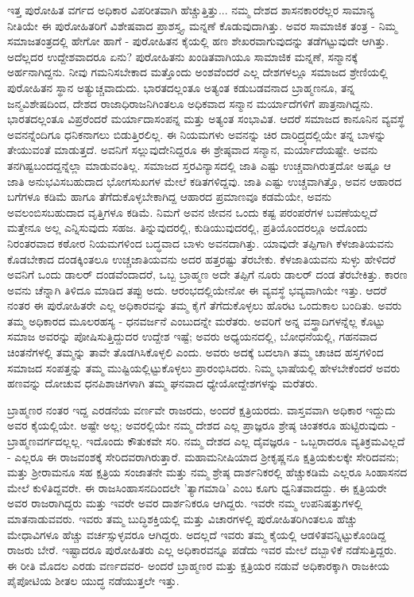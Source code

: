 ಇತ್ತ ಪುರೋಹಿತ ವರ್ಗದ ಅಧಿಕಾರ ವಿಪರೀತವಾಗಿ ಹೆಚ್ಚುತ್ತಿತ್ತು... ನಮ್ಮ ದೇಶದ ಶಾಸನಕಾರರೆಲ್ಲರ ಸಾಮಾನ್ಯ ನೀತಿಯೇ ಈ ಪುರೋಹಿತರಿಗೆ ವಿಶೇಷವಾದ ಪ್ರಾಶಸ್ತ್ಯ, ಮನ್ನಣೆ ಕೊಡುವುದಾಗಿತ್ತು. ಅವರ ಸಾಮಾಜಿಕ ತಂತ್ರ - ನಿಮ್ಮ ಸಮಾಜತಂತ್ರದಲ್ಲಿ ಹೇಗೋ ಹಾಗೆ - ಪುರೋಹಿತನ ಕೈಯಲ್ಲಿ ಹಣ ಶೇಖರವಾಗುವುದನ್ನು ತಡೆಗಟ್ಟುವುದೇ ಆಗಿತ್ತು. ಅದೆಲ್ಲದರ ಉದ್ದೇಶವಾದರೂ ಏನು? ಪುರೋಹಿತನು ಖಂಡಿತವಾಗಿಯೂ ಸಾಮಾಜಿಕ ಮನ್ನಣೆ, ಸನ್ಮಾನಕ್ಕೆ ಅರ್ಹನಾಗಿದ್ದನು. ನೀವು ಗಮನಿಸಬೇಕಾದ ಮತ್ತೊಂದು ಅಂಶವೆಂದರೆ ಎಲ್ಲ ದೇಶಗಳಲ್ಲೂ ಸಮಾಜದ ಶ್ರೇಣಿಯಲ್ಲಿ ಪುರೋಹಿತನ ಸ್ಥಾನ ಅತ್ಯುಚ್ಚವಾದುದು. ಭಾರತದಲ್ಲಂತೂ ಅತ್ಯಂತ ಕಡುಬಡವನಾದ ಬ್ರಾಹ್ಮಣನೂ, ತನ್ನ ಜನ್ಮವಿಶೇಷದಿಂದ, ದೇಶದ ರಾಜಾಧಿರಾಜನಿಗಿಂತಲೂ ಅಧಿಕವಾದ ಸನ್ಮಾನ ಮರ್ಯಾದೆಗಳಿಗೆ ಪಾತ್ರನಾಗಿದ್ದನು. ಭಾರತದಲ್ಲಂತೂ ವಿಪ್ರರೆಂದರೆ ಮರ್ಯಾದಾಸಂಪನ್ನ ಮತ್ತು ಅತ್ಯಂತ ಸಂಭಾವಿತ. ಆದರೆ ಸಮಾಜದ ಕಾನೂನಿನ ವ್ಯವಸ್ಥೆ ಅವನನ್ನೆಂದಿಗೂ ಧನಿಕನಾಗಲು ಬಿಡುತ್ತಿರಲಿಲ್ಲ. ಈ ನಿಯಮಗಳು ಅವನನ್ನು ಚಿರ ದಾರಿದ್ರ್ಯದಲ್ಲಿಯೇ ತನ್ನ ಬಾಳನ್ನು ತೇಯುವಂತೆ ಮಾಡುತ್ತದೆ. ಅವನಿಗೆ ಸಲ್ಲುವುದೇನಿದ್ದರೂ ಈ ಶ್ರೇಷ್ಠವಾದ ಸನ್ಮಾನ, ಮರ್ಯಾದೆಯಷ್ಟೇ. ಅವನು ತನಗಿಷ್ಟಬಂದದ್ದನ್ನೆಲ್ಲಾ ಮಾಡುವಂತಿಲ್ಲ. ಸಮಾಜದ ಸ್ತರವಿನ್ಯಾಸದಲ್ಲಿ ಜಾತಿ ಎಷ್ಟು ಉಚ್ಚವಾಗಿರುತ್ತದೋ ಅಷ್ಟೂ ಆ ಜಾತಿ ಅನುಭವಿಸಬಹುದಾದ ಭೋಗಸುಖಗಳ ಮೇಲೆ ಕಡಿತಗಳಿದ್ದವು. ಜಾತಿ ಎಷ್ಟು ಉಚ್ಚವಾಗಿತ್ತೊ, ಅವನ ಆಹಾರದ ಬಗೆಗಳೂ ಕಡಿಮೆ ಹಾಗೂ ತೆಗೆದುಕೊಳ್ಳಬೇಕಾಗಿದ್ದ ಆಹಾರದ ಪ್ರಮಾಣವೂ ಕಡಮೆಯೇ, ಅವನು ಅವಲಂಬಿಸಬಹುದಾದ ವೃತ್ತಿಗಳೂ ಕಡಿಮೆ. ನಿಮಗೆ ಅವನ ಜೀವನ ಒಂದು ಕಷ್ಟ ಪರಂಪರೆಗಳ ಬವಣೆಯಲ್ಲದೆ ಮತ್ತೇನೂ ಅಲ್ಲ ಎನ್ನಿಸುವುದು ಸಹಜ. ತಿನ್ನುವುದರಲ್ಲಿ, ಕುಡಿಯುವುದರಲ್ಲಿ, ಪ್ರತಿಯೊಂದರಲ್ಲೂ ಅದೊಂದು ನಿರಂತರವಾದ ಕಠೋರ ನಿಯಮಗಳಿಂದ ಬದ್ಧವಾದ ಬಾಳು ಅವನದಾಗಿತ್ತು. ಯಾವುದೇ ತಪ್ಪಿಗಾಗಿ ಕೆಳಜಾತಿಯವನು ಕೊಡಬೇಕಾದ ದಂಡಕ್ಕಿಂತಲೂ ಉಚ್ಚಜಾತಿಯವನು ಅದರ ಹತ್ತರಷ್ಟು ತೆರಬೇಕು. ಕೆಳಜಾತಿಯವನು ಸುಳ್ಳು ಹೇಳಿದರೆ ಅವನಿಗೆ ಒಂದು ಡಾಲರ್ ದಂಡವೆಂದಾದರೆ, ಒಬ್ಬ ಬ್ರಾಹ್ಮಣ ಅದೇ ತಪ್ಪಿಗೆ ನೂರು ಡಾಲರ್ ದಂಡ ತೆರಬೇಕಿತ್ತು. ಕಾರಣ ಅವನು ಚೆನ್ನಾಗಿ ತಿಳಿದೂ ಮಾಡಿದ ತಪ್ಪು ಅದು. ಆರಂಭದಲ್ಲಿಯೇನೋ ಈ ವ್ಯವಸ್ಥೆ ಭವ್ಯವಾಗಿಯೇ ಇತ್ತು. ಆದರೆ ನಂತರ ಈ ಪುರೋಹಿತರೇ ಎಲ್ಲ ಅಧಿಕಾರವನ್ನು ತಮ್ಮ ಕೈಗೆ ತೆಗೆದುಕೊಳ್ಳಲು ಹೊರಟ ಒಂದುಕಾಲ ಬಂದಿತು. ಅವರು ತಮ್ಮ ಅಧಿಕಾರದ ಮೂಲರಹಸ್ಯ - ಧನವರ್ಜನೆ ಎಂಬುದನ್ನೇ ಮರೆತರು. ಅವರಿಗೆ ಅನ್ನ ವಸ್ತ್ರಾದಿಗಳನ್ನೆಲ್ಲ ಕೊಟ್ಟು ಸಮಾಜ ಅವರನ್ನು ಪೋಷಿಸುತ್ತಿದ್ದುದರ ಉದ್ದೇಶ ಇಷ್ಟೆ; ಅವರು ಅಧ್ಯಯನದಲ್ಲಿ, ಬೋಧನೆಯಲ್ಲಿ, ಗಹನವಾದ ಚಿಂತನೆಗಳಲ್ಲಿ ತಮ್ಮನ್ನು ತಾವೇ ತೊಡಗಿಸಿಕೊಳ್ಳಲಿ ಎಂದು. ಅವರು ಅದಕ್ಕೆ ಬದಲಾಗಿ ತಮ್ಮ ಚಾಚಿದ ಹಸ್ತಗಳಿಂದ ಸಮಾಜದ ಸಂಪತ್ತನ್ನು ತಮ್ಮ ಮುಷ್ಟಿಯಲ್ಲಿಟ್ಟುಕೊಳ್ಳಲು ಪ್ರಾರಂಭಿಸಿದರು. ನಿಮ್ಮ ಭಾಷೆಯಲ್ಲಿ ಹೇಳಬೇಕೆಂದರೆ ಅವರು ಹಣವನ್ನು ದೋಚುವ ಧನಪಿಶಾಚಿಗಳಾಗಿ ತಮ್ಮ ಘನವಾದ ಧ್ಯೇಯೋದ್ದೇಶಗಳನ್ನು ಮರೆತರು.

ಬ್ರಾಹ್ಮಣರ ನಂತರ ಇದ್ದ ಎರಡನೆಯ ವರ್ಣವೇ ರಾಜರದು, ಅಂದರೆ ಕ್ಷತ್ರಿಯರದು. ವಾಸ್ತವವಾಗಿ ಅಧಿಕಾರ ಇದ್ದುದು ಅವರ ಕೈಯಲ್ಲಿಯೇ. ಅಷ್ಟೇ ಅಲ್ಲ; ಅವರಲ್ಲಿಯೇ ನಮ್ಮ ದೇಶದ ಎಲ್ಲ ಪ್ರಾಜ್ಞರೂ ಶ್ರೇಷ್ಠ ಚಿಂತಕರೂ ಹುಟ್ಟಿರುವುದು - ಬ್ರಾಹ್ಮಣವರ್ಗದಲ್ಲಲ್ಲ. ಇದೊಂದು ಕೌತುಕವೇ ಸರಿ. ನಮ್ಮ ದೇಶದ ಎಲ್ಲ ದೈವಜ್ಞರೂ - ಒಬ್ಬರಾದರೂ ವ್ಯತಿಕ್ರಮವಿಲ್ಲದೆ - ಎಲ್ಲರೂ ಈ ರಾಜವಂಶಕ್ಕೆ ಸೇರಿದವರಾಗಿರುತ್ತಾರೆ. ಮಹಾಮನೀಷಿಯಾದ ಶ‍್ರೀಕೃಷ್ಣನೂ ಕ್ಷತ್ರಿಯಕುಲಕ್ಕೇ ಸೇರಿದವನು; ಮತ್ತು ಶ‍್ರೀರಾಮನೂ ಸಹ ಕ್ಷತ್ರಿಯ ಸಂಜಾತನೇ ಮತ್ತು ನಮ್ಮ ಶ್ರೇಷ್ಠ ದಾರ್ಶನಿಕರಲ್ಲಿ ಹೆಚ್ಚುಕಡಿಮೆ ಎಲ್ಲರೂ ಸಿಂಹಾಸನದ ಮೇಲೆ ಕುಳಿತಿದ್ದವರೇ. ಈ ರಾಜಸಿಂಹಾಸನದಿಂದಲೇ 'ತ್ಯಾಗಮಾಡಿ' ಎಂಬ ಕೂಗು ಧ್ವನಿತವಾದದ್ದು. ಈ ಕ್ಷತ್ರಿಯರೇ ಅವರ ರಾಜರಾಗಿದ್ದರು ಮತ್ತು ಇವರೇ ಅವರ ದಾರ್ಶನಿಕರೂ ಆಗಿದ್ದರು. ಇವರೇ ನಮ್ಮ ಉಪನಿಷತ್ತುಗಳಲ್ಲಿ ಮಾತನಾಡುವವರು. ಇವರು ತಮ್ಮ ಬುದ್ಧಿಶಕ್ತಿಯಲ್ಲಿ ಮತ್ತು ವಿಚಾರಗಳಲ್ಲಿ ಪುರೋಹಿತರಿಗಿಂತಲೂ ಹೆಚ್ಚು ಮೇಧಾವಿಗಳೂ ಹೆಚ್ಚು ವರ್ಚಸ್ಸುಳ್ಳವರೂ ಆಗಿದ್ದರು. ಅದಲ್ಲದೆ ಇವರು ತಮ್ಮ ಕೈಯಲ್ಲಿ ಆಡಳಿತವನ್ನಿಟ್ಟುಕೊಂಡಿದ್ದ ರಾಜರು ಬೇರೆ. ಇಷ್ಟಾದರೂ ಪುರೋಹಿತರು ಎಲ್ಲ ಅಧಿಕಾರವನ್ನೂ ಪಡೆದು ಇವರ ಮೇಲೆ ದಬ್ಬಾಳಿಕೆ ನಡೆಸುತ್ತಿದ್ದರು. ಈ ರೀತಿ ಮೊದಲ ಎರಡು ವರ್ಣದವರ- ಅಂದರೆ ಬ್ರಾಹ್ಮಣರ ಮತ್ತು ಕ್ಷತ್ರಿಯರ ನಡುವೆ ಅಧಿಕಾರಕ್ಕಾಗಿ ರಾಜಕೀಯ ಪೈಪೋಟಿಯ ಶೀತಲ ಯುದ್ಧ ನಡೆಯುತ್ತಲೇ ಇತ್ತು.

